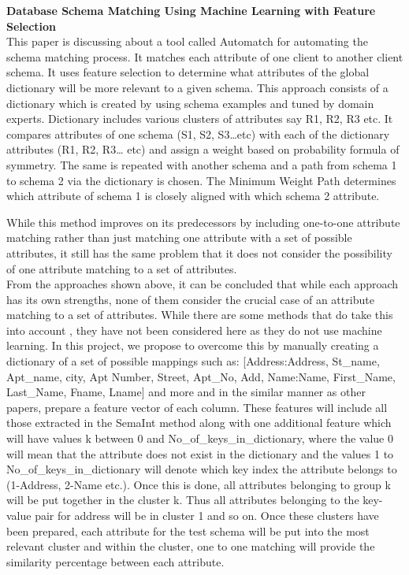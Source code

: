 \documentclass{article}
\begin{document}
\noindent
\textbf{Database Schema Matching Using Machine Learning with Feature Selection}\cite{ref4}\\
This paper is discussing about a tool called Automatch for automating the schema matching process. It matches each attribute of one client to another client schema. It uses feature selection to determine what attributes of the global dictionary will be more relevant to a given schema. This approach consists of a dictionary which is created by using schema examples and tuned by domain experts. Dictionary includes various clusters of attributes say R1, R2, R3 etc. It compares attributes of one schema (S1, S2, S3…etc) with each of the dictionary attributes (R1, R2, R3… etc) and assign a weight based on probability formula of symmetry. The same is repeated with another schema and a path from schema 1 to schema 2 via the dictionary is chosen. The Minimum Weight Path determines which attribute of schema 1 is closely aligned with which schema 2 attribute.

While this method improves on its predecessors by including one-to-one attribute matching rather than just matching one attribute with a set of possible attributes, it still has the same problem that it does not consider the possibility of one attribute matching to a set of attributes.\\


\noindent
From the approaches shown above, it can be concluded that while each approach has its own strengths, none of them consider the crucial case of an attribute matching to a set of attributes. While there are some methods that do take this into account \cite{ref3}, they have not been considered here as they do not use machine learning. In this project, we propose to overcome this by manually creating a dictionary of a set of possible mappings such as: [Address:{Address, St\_name, Apt\_name, city, Apt Number, Street, Apt\_No, Add}, Name:{Name, First\_Name, Last\_Name, Fname, Lname}] and more and in the similar manner as other papers, prepare a feature vector of each column. These features will include all those extracted in the SemaInt method along with one additional feature which will have values k between 0 and No\_of\_keys\_in\_dictionary, where the value 0 will mean that the attribute does not exist in the dictionary and the values 1 to No\_of\_keys\_in\_dictionary will denote which key index the attribute belongs to (1-Address, 2-Name etc.). Once this is done, all attributes belonging to group k will be put together in the cluster k. Thus all attributes belonging to the key-value pair for address will be in cluster 1 and so on. Once these clusters have been prepared, each attribute for the test schema will be put into the most relevant cluster and within the cluster, one to one matching will provide the similarity percentage between each attribute.
  


\end{document}
